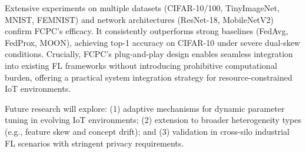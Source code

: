 \documentclass[journal,twoside,web]{ieeecolor}
\begin{document}
Extensive experiments on multiple datasets (CIFAR-10/100, TinyImageNet, MNIST, FEMNIST) and network architectures (ResNet-18, MobileNetV2) confirm FCPC's efficacy. It consistently outperforms strong baselines (FedAvg, FedProx, MOON), achieving top-1 accuracy on CIFAR-10 under severe dual-skew conditions. Crucially, FCPC's plug-and-play design enables seamless integration into existing FL frameworks without introducing prohibitive computational burden, offering a practical system integration strategy for resource-constrained IoT environments.

Future research will explore: (1) adaptive mechanisms for dynamic parameter tuning in evolving IoT environments; (2) extension to broader heterogeneity types (e.g., feature skew and concept drift); and (3) validation in cross-silo industrial FL scenarios with stringent privacy requirements.




\end{document}
